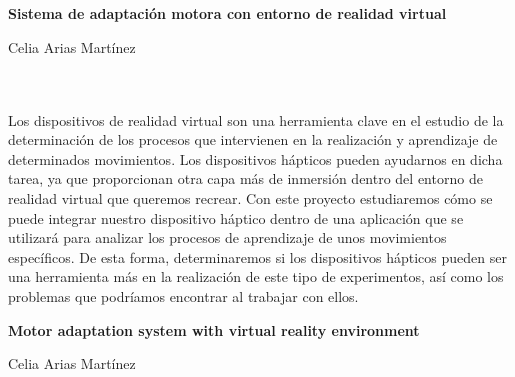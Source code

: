\chapter*{}


%



\cleardoublepage
\thispagestyle{empty}

\begin{center}
{\large\bfseries Sistema de adaptación motora con entorno de realidad virtual}\\
\end{center}
\begin{center}
Celia Arias Martínez\\
\end{center}

\\

\vspace{0.7cm}
\\

Los dispositivos de realidad virtual son una herramienta clave en el estudio de la determinación de los procesos que intervienen en la realización y aprendizaje de determinados movimientos. Los dispositivos hápticos pueden ayudarnos en dicha tarea, ya que proporcionan otra capa más de inmersión dentro del entorno de realidad virtual que queremos recrear. Con este proyecto estudiaremos cómo se puede integrar nuestro dispositivo háptico dentro de una aplicación que se utilizará para analizar los procesos de aprendizaje de unos movimientos específicos. De esta forma, determinaremos si los dispositivos hápticos pueden ser una herramienta más en la realización de este tipo de experimentos, así como los problemas que podríamos encontrar al trabajar con ellos.


\cleardoublepage


\thispagestyle{empty}


\begin{center}
{\large\bfseries Motor adaptation system with virtual reality environment}\\
\end{center}
\begin{center}
Celia Arias Martínez\\
\end{center}

